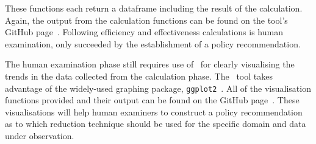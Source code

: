 These functions each return a dataframe including the result of the calculation.
Again, the output from the calculation functions can be found on
the tool's GitHub page~\cite{tool}. Following efficiency and effectiveness calculations
is human examination, only succeeded by the establishment of a policy recommendation.

The human examination phase still requires use of \mr~for clearly visualising the trends
in the data collected from the calculation phase. The \mr~tool takes advantage of the
widely-used graphing package, \texttt{ggplot2}~\cite{ggplot2}. All of the visualisation
functions provided and their output can be found on the GitHub page~\cite{tool}.
These visualisations will help human examiners to construct a policy recommendation as
to which reduction technique should be used for the specific domain and data under observation.
